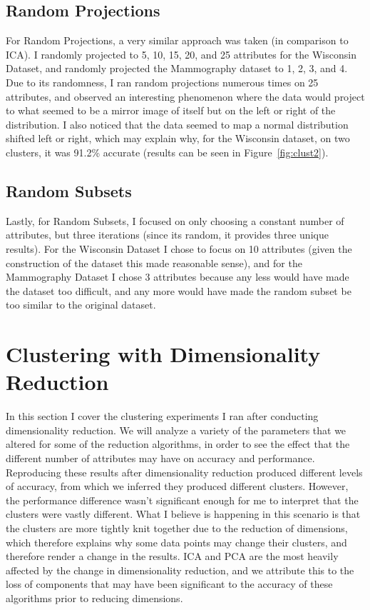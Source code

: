 \documentclass[annual]{acmsiggraph}
\begin{document}
\subsection{Random Projections}
For Random Projections, a very similar approach was taken (in comparison to ICA). I randomly projected to 5, 10, 15, 20, and 25 attributes for the Wisconsin Dataset, and randomly projected the Mammography dataset to 1, 2, 3, and 4. Due to its randomness, I ran random projections numerous times on 25 attributes, and observed an interesting phenomenon where the data would project to what seemed to be a mirror image of itself but on the left or right of the distribution. I also noticed that the data seemed to map a normal distribution shifted left or right, which may explain why, for the Wisconsin dataset, on two clusters, it was 91.2\% accurate (results can be seen in Figure~\ref{fig:clust2}).
\subsection{Random Subsets}
Lastly, for Random Subsets, I focused on only choosing a constant number of attributes, but three iterations (since its random, it provides three unique results). For the Wisconsin Dataset I chose to focus on 10 attributes (given the construction of the dataset this made reasonable sense), and for the Mammography Dataset I chose 3 attributes because any less would have made the dataset too difficult, and any more would have made the random subset be too similar to the original dataset.
\section{Clustering with Dimensionality Reduction}
In this section I cover the clustering experiments I ran after conducting dimensionality reduction. We will analyze a variety of the parameters that we altered for some of the reduction algorithms, in order to see the effect that the different number of attributes may have on accuracy and performance. Reproducing these results after dimensionality reduction produced different levels of accuracy, from which we inferred they produced different clusters. However, the performance difference wasn't significant enough for me to interpret that the clusters were vastly different. What I believe is happening in this scenario is that the clusters are more tightly knit together due to the reduction of dimensions, which therefore explains why some data points may change their clusters, and therefore render a change in the results. ICA and PCA are the most heavily affected by the change in dimensionality reduction, and we attribute this to the loss of components that may have been significant to the accuracy of these algorithms prior to reducing dimensions.
\end{document}
